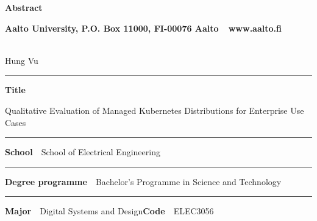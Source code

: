 
\newpage
{}
{}


\begin{spacing}{.88}

{\parindent0pt %

{\fontsize{13.9pt}{13.9pt}\selectfont
\vspace{-8.9mm}\hfill{\bfseries\sffamily\lsstyle Abstract}}

{\fontsize{9.48pt}{9.48pt}\selectfont
\vspace{.9mm}\hfill{\bfseries\sffamily\lsstyle Aalto University, P.O. Box 11000, FI-00076 Aalto~~\textcolor{aaltoGray}{www.aalto.fi}}}

\\
{\small Hung Vu}

\vspace{-2.4mm}\rule{\textwidth}{.75pt}

{\fontsize{10.5pt}{10.5pt}\bfseries\sffamily\lsstyle Title}\\
\parbox[t]{\textwidth}{\raggedright\small Qualitative Evaluation of Managed Kubernetes Distributions for Enterprise Use Cases}

\vspace{.5mm}\rule{\textwidth}{.75pt}

{\fontsize{10.5pt}{10.5pt}\bfseries\sffamily\lsstyle School}~~{\small School of Electrical Engineering}

\vspace{-2.4mm}\rule{\textwidth}{.75pt}

{\fontsize{10.5pt}{10.5pt}\bfseries\sffamily\lsstyle Degree programme}~~{\small Bachelor’s Programme in Science and Technology}

\vspace{-2.4mm}\rule{\textwidth}{.75pt}

{\fontsize{10.5pt}{10.5pt}\bfseries\sffamily\lsstyle Major}~~{\small Digital Systems and Design}\hfill{\fontsize{10.5pt}{10.5pt}\bfseries\sffamily\lsstyle Code}~~{\small ELEC3056}

}
\end{spacing}
